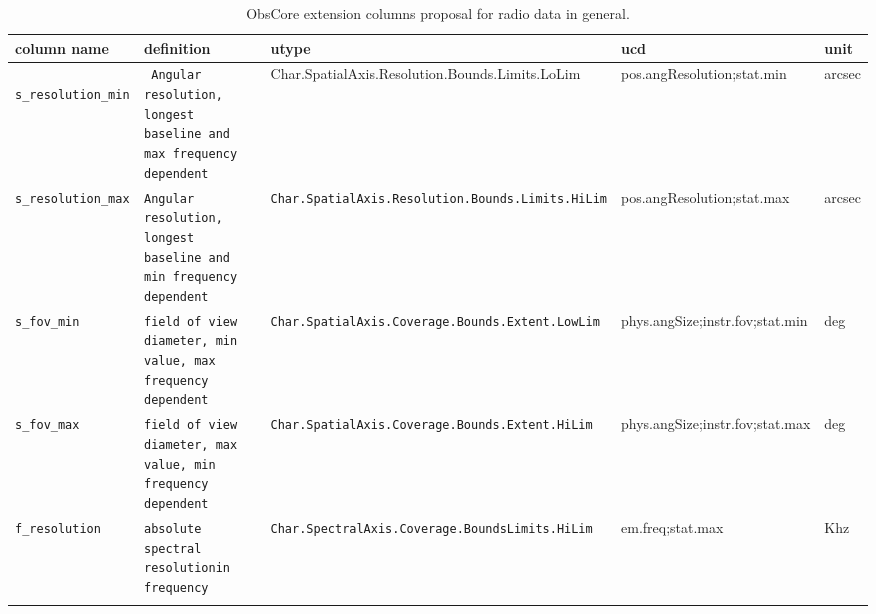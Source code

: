 \documentclass[11pt,a4paper]{ivoa}
\begin{document}
\begin{landscape}
\begin{longtable}{l p{4.5cm}| p{4cm}| l l |}
\hline
\textbf{column name}&\textbf{definition}&\textbf{utype}&\textbf{ucd}&\textbf{unit}\\
\hline
\texttt{ s\_resolution\_min}&\texttt{ Angular resolution, \newline longest baseline and \newline  max frequency dependent}&{ Char.SpatialAxis.\newline Resolution.Bounds.\newline Limits.LoLim}&{pos.angResolution;stat.min}&{arcsec}\\
\hline
\texttt{s\_resolution\_max}&\texttt{Angular resolution, \newline longest baseline and \newline min frequency dependent}&\texttt{Char.SpatialAxis.\newline Resolution.Bounds.\newline Limits.HiLim}&{pos.angResolution;stat.max}&arcsec \\
\hline
\texttt{s\_fov\_min}&\texttt{field of view diameter, \newline min value, \newline max frequency dependent}&\texttt{Char.SpatialAxis.\newline Coverage.Bounds.\newline Extent.LowLim}&{phys.angSize;instr.fov;\newline stat.min}&deg\\
\hline
\texttt{s\_fov\_max}&\texttt{field of view diameter, \newline max value, \newline min frequency dependent}&\texttt{Char.SpatialAxis.\newline Coverage.Bounds.\newline Extent.HiLim}&{phys.angSize;instr.fov;\newline stat.max}&deg\\
\hline
\texttt{f\_resolution}&\texttt{absolute spectral resolution\newline in frequency}&\texttt{Char.SpectralAxis.\newline Coverage.Bounds\newline Limits.HiLim}&{em.freq;stat.max}&Khz\\
\hline
\caption{ObsCore extension columns proposal for radio data in general.}
\label{tab:ExtensionAtt}
\end{longtable}
\end{landscape}
\end{document}
